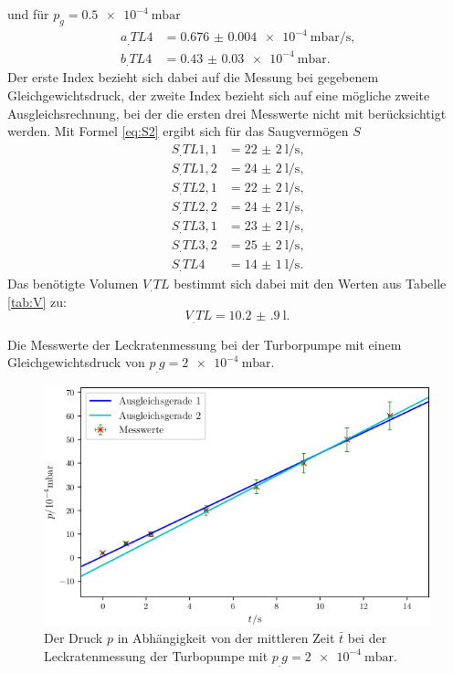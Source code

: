 und für $p_g = \SI{0.5e-4}{\milli\bar}$
\begin{align*}
a_.{TL4} &= \SI{0.676(4)e-4}{\milli\bar\per\second} \text{,}\\
b_.{TL4} &= \SI{0.43(3)e-4}{\milli\bar} \text{.}
\end{align*}
Der erste Index bezieht sich dabei auf die Messung bei gegebenem Gleichgewichtsdruck, der zweite Index bezieht sich auf eine mögliche zweite Ausgleichsrechnung, bei der die ersten drei Messwerte nicht mit berücksichtigt werden.
Mit Formel \eqref{eq:S2} ergibt sich für das Saugvermögen $S$
\begin{align*}
S_.{TL1,1} &= \SI{22(2)}{\litre\per\second} \text{,}\\
S_.{TL1,2} &= \SI{24(2)}{\litre\per\second} \text{,}\\
S_.{TL2,1} &= \SI{22(2)}{\litre\per\second} \text{,}\\
S_.{TL2,2} &= \SI{24(2)}{\litre\per\second} \text{,}\\
S_.{TL3,1} &= \SI{23(2)}{\litre\per\second} \text{,}\\
S_.{TL3,2} &= \SI{25(2)}{\litre\per\second} \text{,}\\
S_.{TL4}   &= \SI{14(1)}{\litre\per\second} \text{.}
\end{align*}
Das benötigte Volumen $V_.{TL}$ bestimmt sich dabei mit den Werten aus Tabelle \ref{tab:V} zu:
\[
V_.{TL} = \SI{10.2(9)}{\litre}\text{.}
\]

\newpage
\begin{table}
\centering
\caption{Die Messwerte der Leckratenmessung bei der Turborpumpe mit einem Gleichgewichtsdruck von $p_.g = \SI{2e-4}{\milli\bar}$.}

\label{tab:TL1}
\end{table}

\begin{figure}
\centering
\includegraphics[width=\linewidth-70pt,height=\textheight-70pt,keepaspectratio]{content/images/TL1.png}
\caption{Der Druck $p$ in Abhängigkeit von der mittleren Zeit $\bar{t}$ bei der Leckratenmessung der Turbopumpe  mit $p_.g = \SI{2e-4}{\milli\bar}$.}
\label{fig:TL1}
\end{figure}

